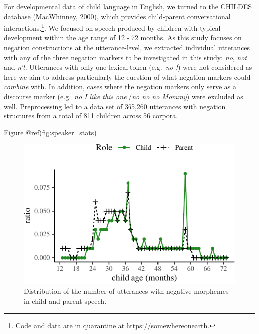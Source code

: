 \documentclass[10pt, letterpaper]{article}
\newenvironment{CodeChunk}{}{}
\begin{document}
For developmental data of child language in English, we turned to the
CHILDES database (MacWhinney, 2000), which provides child-parent
conversational
interactions.\footnote{Code and data are in quarantine at https://somewhereonearth.}.
We focused on speech produced by children with typical development
within the age range of 12 - 72 months. As this study focuses on
negation constructions at the utterance-level, we extracted individual
utterances with any of the three negation markers to be investigated in
this study: \emph{no}, \emph{not} and \emph{n't}. Utterances with only
one lexical token (e.g.~\emph{no !}) were not considered as here we aim
to address particularly the question of what negation markers could
\emph{combine} with. In addition, cases where the negation markers only
serve as a discourse marker (e.g.~\emph{no I like this one} /\emph{no no
no Mommy}) were excluded as well. Preprocessing led to a data set of
365,260 utterances with negation structures from a total of 811 children
across 56 corpora.

Figure @ref(fig:speaker\_stats)

\begin{CodeChunk}
\begin{figure}[H]

{\centering \includegraphics{figs/speaker_stats-1} 

}

\caption[Distribution of the number of utterances with negative morphemes in child and parent speech]{Distribution of the number of utterances with negative morphemes in child and parent speech.}\label{fig:speaker_stats}
\end{figure}
\end{CodeChunk}
\end{document}
